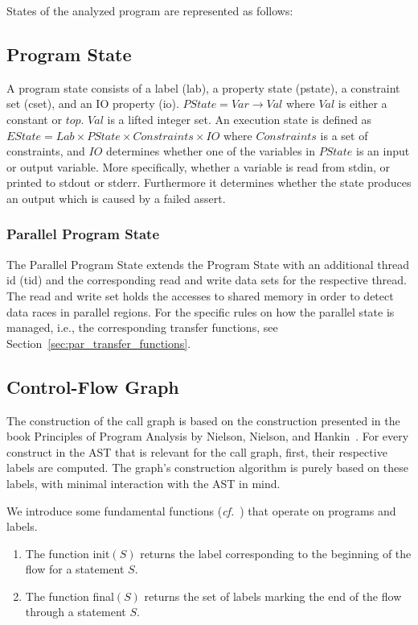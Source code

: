 \documentclass[natbib]{article}
\begin{document}
\noindent States of the analyzed program are represented as follows:

\subsection{Program State}

A program state consists of a label (lab), a property state (pstate),
a constraint set (cset), and an IO property (io). $PState = Var
\rightarrow Val$ where $Val$ is either a constant or $top$. $Val$ is a
lifted integer set. An execution state is defined as $EState = Lab \times
PState \times Constraints \times IO$ where $Constraints$ is a set of
constraints, and $IO$ determines whether one of the variables in $PState$ is
an input or output variable. More specifically, whether a variable is
read from stdin, or printed to stdout or stderr. Furthermore it
determines whether the state produces an output which is caused by a
failed assert.


\subsubsection{Parallel Program State}

The Parallel Program State extends the Program State with an additional thread id (tid) and the corresponding read and write data sets for the respective thread.
The read and write set holds the accesses to shared memory in order to detect data races in parallel regions.
For the specific rules on how the parallel state is managed, i.e., the corresponding transfer functions, see Section~\ref{sec:par_transfer_functions}.


\subsection{Control-Flow Graph}
The construction of the call graph is based on the construction presented in the book Principles of Program Analysis by Nielson, Nielson, and Hankin~\cite{NielsonNielson}.
For every construct in the AST that is relevant for the call graph, first, their respective labels are computed.
The graph's construction algorithm is purely based on these labels, with minimal interaction with the AST in mind.

We introduce some fundamental functions (\emph{cf.}~\cite{NielsonNielson}) that operate on programs and labels.
\begin{enumerate}
\item The function init$(S)$ returns the label corresponding to the beginning of the flow for a statement $S$.
\item The function final$(S)$ returns the set of labels marking the end of the flow through a statement $S$.
\end{enumerate}
\end{document}
